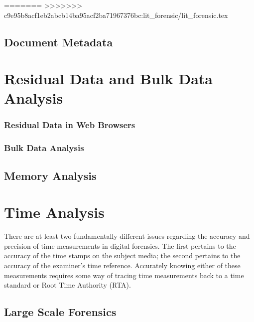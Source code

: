 \documentclass[11pt,letter]{article}
\begin{document}
=======
>>>>>>> c9e95b8acf1eb2abcb14ba95acf2ba71967376bc:lit_forensic/lit_forensic.tex
\section{Document Metadata}
\chapter{Residual Data and Bulk Data Analysis}


\subsection{Residual Data in Web Browsers}
\cite{dfrws2011:JunghoonOhAndSeungbongLeeAndSangjinLee}

\subsection{Bulk Data Analysis}

\cite{dfrws2011:RobertBeverlyAndSimsonGarfinkelAndGregCardwell}
\cite{dfrws2011:RalfBrown}


\section{Memory Analysis}
\cite{dfrws2011:JamesOkolicaAndGilbertPeterson}
\chapter{Time Analysis}

There are at least two
fundamentally different issues regarding the accuracy and precision of
time measurements in digital forensics. The first pertains to the accuracy of
the time stamps on the subject media; the second pertains to the
accuracy of the examiner's time reference. Accurately knowing either
of these measurements requires some way of tracing time measurements
back to a time standard or Root Time Authority (RTA)\cite{dfrws2002:MichaelDuren}.

\cite{dfrws2011:AndrewMarringtonAndIbrahimBaggiliAndGeorgeMohayAndAndrewClark}


\section{Large Scale Forensics}
\end{document}
